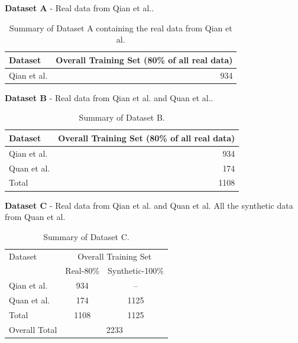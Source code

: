 \documentclass[11pt]{ociamthesis}  %
\begin{document}
\textbf{Dataset A} - Real data from Qian et al.\cite{qian2018attentive}.
\begin{table}[ht]
    \centering
    \begin{tabular}{@{}l r@{}}
        \toprule
        Dataset & Overall Training Set (80\% of all real data) \\
        \midrule
        Qian et al. & 934 \\
        \bottomrule
    \end{tabular}
    \caption{Summary of Dataset A containing the real data from Qian et al.}
    \label{table:dataset_a}
\end{table}


\textbf{Dataset B} - Real data from Qian et al. and Quan et al.\cite{quan2021removing}.
\begin{table}[ht]
    \centering
    \begin{tabular}{@{}l r@{}}
        \toprule
        Dataset & Overall Training Set (80\% of all real data) \\
        \midrule
        Qian et al. & 934 \\
        Quan et al. & 174 \\
        \midrule
        Total & 1108 \\
        \bottomrule
    \end{tabular}
    \caption{Summary of Dataset B.}
    \label{table:dataset_b}
\end{table}

\textbf{Dataset C} - Real data from Qian et al. and Quan et al. All the synthetic data from Quan et al. 
\begin{table}[ht]
    \centering
    \begin{tabular}{@{}l c c@{}}
        \toprule
        Dataset & \multicolumn{2}{c}{Overall Training Set} \\
        \cmidrule(lr){2-3}
                  & Real-80\% & Synthetic-100\% \\
        \midrule
        Qian et al. & 934  & --   \\
        Quan et al. & 174  & 1125 \\
        \midrule
        Total & 1108 & 1125 \\
        \midrule
        Overall Total & \multicolumn{2}{c}{2233} \\
        \bottomrule
    \end{tabular}
    \caption{Summary of Dataset C.}
    \label{table:dataset_c}
\end{table}
\end{document}
